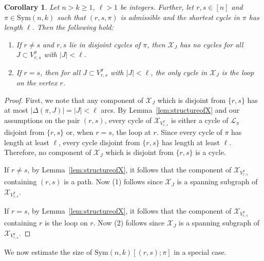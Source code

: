 \documentclass{amsart}
\newtheorem{cor}[thm]{Corollary}
\newcommand{\mcal}{\mathcal}
\newcommand{\sym}{\mathrm{Sym}}
\begin{document}
\begin{cor}\label{cor:xjlongcycle}
Let $n>k\geq1$, $\ell>1$ be integers. Further, let $r,s\in [n]$ and $\pi \in \sym(n,k)$ such that $(r,s,\pi)$ is admissible and the shortest cycle in $\pi$  has length $\ell$. Then the following hold:
\begin{enumerate}
\item If $r\neq s$ and $r,s$ lie in disjoint cycles of $\pi$, then $\mcal{X}_{J}$ has no cycles for all $J\subset V_{r,s}^{\pi}$ with $|J|<\ell$.
\item If $r=s$, then for all $J\subset V_{r,s}^{\pi}$ with $|J|<\ell$, the only cycle in $\mcal{X}_{J}$ is the loop on the vertex $r$.
\end{enumerate}
\end{cor}
\begin{proof}
First, we note that any component of $\mcal{X}_{J}$ which is disjoint from $\{r,s\}$ has at most $|\Delta(\pi, J)|=|J|<\ell$ arcs. By Lemma~\ref{lem:structureofX} and our assumptions on the pair $(r,s)$, every cycle of $\mcal{X}_{V_{r,s}^{\pi}}$ is either a cycle of $\mcal{L}_{\pi}$ disjoint from $\{r,s\}$ or, when $r=s$, the loop at $r$. Since every cycle of $\pi$ has length at least $\ell$, every cycle disjoint from $\{r,s\}$ has length at least $\ell$. Therefore, no component of $\mcal{X}_{J}$ which is disjoint from $\{r,s\}$ is a cycle. 

If $r\neq s$, by Lemma~\ref{lem:structureofX}, it follows that the component of $\mcal{X}_{V_{r,s}^{\pi}}$ containing $(r,s)$ is a path. Now (1) follows since $\mcal{X}_{J}$ is a spanning subgraph of $\mcal{X}_{V_{r,s}^{\pi}}$. 

If $r=s$, by Lemma~\ref{lem:structureofX}, it follows that the component of $\mcal{X}_{V_{r,s}^{\pi}}$ containing $r$ is the loop on $r$. Now (2) follows since $\mcal{X}_{J}$ is a spanning subgraph of $\mcal{X}_{V_{r,s}^{\pi}}$. 
\end{proof}

We now estimate the size of $\sym(n,k)[(r,s);\pi]$ in a special case.
\end{document}
